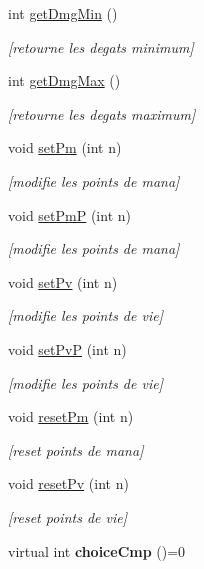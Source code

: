 \begin{DoxyCompactItemize}
int \hyperlink{classperso_ade68d24d4ba5af130d7b083d27475097}{get\+Dmg\+Min} ()
\begin{DoxyCompactList}\small\item\em \mbox{[}retourne les degats minimum\mbox{]} \end{DoxyCompactList}\item 
int \hyperlink{classperso_a2e2ad259f19c593468dc0bfecee1a705}{get\+Dmg\+Max} ()
\begin{DoxyCompactList}\small\item\em \mbox{[}retourne les degats maximum\mbox{]} \end{DoxyCompactList}\item 
void \hyperlink{classperso_a73d58834d3ded8c43ea88c8f29164126}{set\+Pm} (int n)
\begin{DoxyCompactList}\small\item\em \mbox{[}modifie les points de mana\mbox{]} \end{DoxyCompactList}\item 
void \hyperlink{classperso_a29bef28c3511b57f07ba709859a94445}{set\+PmP} (int n)
\begin{DoxyCompactList}\small\item\em \mbox{[}modifie les points de mana\mbox{]} \end{DoxyCompactList}\item 
void \hyperlink{classperso_ab89e95d6a00dfd9f59e6e82514ffbf76}{set\+Pv} (int n)
\begin{DoxyCompactList}\small\item\em \mbox{[}modifie les points de vie\mbox{]} \end{DoxyCompactList}\item 
void \hyperlink{classperso_aaa563fa42da0f3d5d7583cbdd9cc6978}{set\+PvP} (int n)
\begin{DoxyCompactList}\small\item\em \mbox{[}modifie les points de vie\mbox{]} \end{DoxyCompactList}\item 
void \hyperlink{classperso_a4bcc4446c996892afee3a4f4f46b8ff4}{reset\+Pm} (int n)
\begin{DoxyCompactList}\small\item\em \mbox{[}reset points de mana\mbox{]} \end{DoxyCompactList}\item 
void \hyperlink{classperso_ae61322308a99edf835ffe4243dc9767f}{reset\+Pv} (int n)
\begin{DoxyCompactList}\small\item\em \mbox{[}reset points de vie\mbox{]} \end{DoxyCompactList}\item 
virtual int {\bfseries choice\+Cmp} ()=0\hypertarget{classperso_a3cc4bfd685842e8eb754ccb91023e0bc}{}\label{classperso_a3cc4bfd685842e8eb754ccb91023e0bc}

\end{DoxyCompactItemize}


